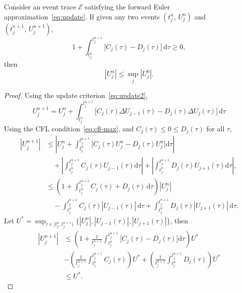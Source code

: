 \begin{theorem}
Consider an event trace $\mathcal{E}$ satisfying the forward Euler approximation~\eqref{eq:update}. If given any two events $(t_j^n,\,U_j^n)$ and $(t_j^{n+1},\,U_j^{n+1})$,
\begin{equation}
1 + \int_{t_j^n}^{t_j^{n+1}} \big[ C_j(\tau) - D_j(\tau) \big] \,\mathrm{d}\tau \ge 0,
\label{eq:cfl-max}
\end{equation}
then
\begin{equation*}
|U^n_j| \le \sup_j |U^0_j|.
\end{equation*}
\label{thm:max}
\end{theorem}
\begin{proof}
Using the update criterion~\eqref{eq:update2},
\begin{equation*}
U^{n+1}_j = U_j^n + \int_{t_j^n}^{t_j^{n+1}} \big[ C_j(\tau) \Delta U_{j-1}(\tau) -D_j(\tau) \Delta U_j(\tau) \big] \, \mathrm{d}\tau
\end{equation*}
Using the CFL condition~\eqref{eq:cfl-max}, and $C_j(\tau) \le 0 \le D_j(\tau)$ for all $\tau$,
\begin{align*}
\left| U^{n+1}_j \right| & \le
\left| U_j^n + \int_{t^n_j}^{t^{n+1}_j} \big[ C_j(\tau) U_j^n - D_j(\tau)  U_j^n \big] \mathrm{d} \tau \right| \\
& \quad + \left| \int_{t^n_j}^{t^{n+1}_j} C_j(\tau) U_{j-1}(\tau) \mathrm{d} \tau \right| + \left| \int_{t^n_j}^{t^{n+1}_j} D_j(\tau) U_{j+1}(\tau) \mathrm{d} \tau \right|,\\
& \le \left( 1+ \int_{t^n_j}^{t^{n+1}_j} C_j(\tau)  + D_j(\tau) \, \mathrm{d} \tau \right) |U_j^n|\\
& \quad - \int_{t^n_j}^{t^{n+1}_j} C_j(\tau) |U_{j-1}(\tau)| \,\mathrm{d}\tau + \int_{t^n_j}^{t^{n+1}_j} D_j(\tau) |U_{j+1}(\tau)| \,\mathrm{d}\tau.
\end{align*}
Let $U^* = \sup_{\tau \in [t_j^n,t_j^{n+1})} \{ |U_j^n|, |U_{j-1}(\tau)|, |U_{j+1}(\tau)| \}$, then \
\begin{align*}
|U^{n+1}_j| & \le \left( 1 + \frac{1}{t_j^{n+1}} \int_{t_j^n}^{t_j^{n+1}} \big[ C_j(\tau) - D_j(\tau) \big]\mathrm{d} \tau \right) U^* \\
& - \left( \frac{1}{t_j^{n+1}} \int_{t_j^n}^{t_j^{n+1}} C_j(\tau) \right) U^* + \left( \frac{1}{t_j^{n+1}} \int_{t_j^n}^{t_j^{n+1}} D_j(\tau) \right) U^*\\
& \le U^*.
\end{align*}


\end{proof}
